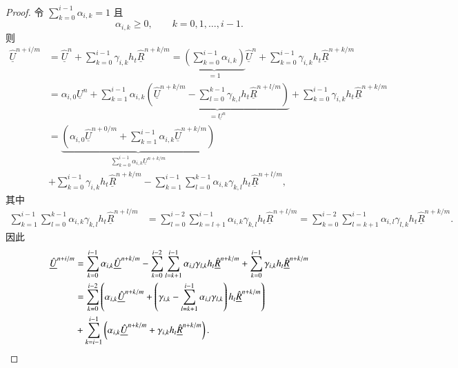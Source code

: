 \begin{proof}
令 $\sum_{k=0}^{i-1}\alpha_{i,k}=1$ 且
\begin{equation}
\alpha_{i,k}\ge0,\qquad k=0,1,\dots,i-1.
\end{equation}
则
\begin{equation}
\begin{aligned}\underline{\hat{U}}^{n+i/m} & =\underline{\hat{U}}^{n}+\sum_{k=0}^{i-1}\gamma_{i,k}h_{t}\underline{\hat{R}}^{n+k/m}=\underbrace{\left(\sum_{k=0}^{i-1}\alpha_{i,k}\right)}_{=1}\underline{\hat{U}}^{n}+\sum_{k=0}^{i-1}\gamma_{i,k}h_{t}\underline{\hat{R}}^{n+k/m}\\
 & =\alpha_{i,0}\underline{U}^{n}+\sum_{k=1}^{i-1}\alpha_{i,k}\underbrace{\left(\underline{\hat{U}}^{n+k/m}-\sum_{l=0}^{k-1}\gamma_{k,l}h_{t}\underline{\hat{R}}^{n+l/m}\right)}_{=\underline{U}^{n}}+\sum_{k=0}^{i-1}\gamma_{i,k}h_{t}\underline{\hat{R}}^{n+k/m}\\
 & =\underbrace{\left(\alpha_{i,0}\underline{\hat{U}}^{n+0/m}+\sum_{k=1}^{i-1}\alpha_{i,k}\underline{\hat{U}}^{n+k/m}\right)}_{\sum_{k=0}^{i-1}\alpha_{i,k}\underline{U}^{n+k/m}}\\
 & +\sum_{k=0}^{i-1}\gamma_{i,k}h_{t}\underline{\hat{R}}^{n+k/m}-\sum_{k=1}^{i-1}\sum_{l=0}^{k-1}\alpha_{i,k}\gamma_{k,l}h_{t}\underline{\hat{R}}^{n+l/m},
\end{aligned}
\end{equation}
其中
\begin{equation}
\begin{aligned}\sum_{k=1}^{i-1}\sum_{l=0}^{k-1}\alpha_{i,k}\gamma_{k,l}h_{t}\underline{\hat{R}}^{n+l/m} & =\sum_{l=0}^{i-2}\sum_{k=l+1}^{i-1}\alpha_{i,k}\gamma_{k,l}h_{t}\underline{\hat{R}}^{n+l/m}=\sum_{k=0}^{i-2}\sum_{l=k+1}^{i-1}\alpha_{i,l}\gamma_{l,k}h_{t}\underline{\hat{R}}^{n+k/m}.\end{aligned}
\end{equation}
因此
\begin{equation}
\begin{aligned}\underline{\hat{U}}^{n+i/m} & =\sum_{k=0}^{i-1}\alpha_{i,k}\underline{\hat{U}}^{n+k/m}-\sum_{k=0}^{i-2}\sum_{l=k+1}^{i-1}\alpha_{i,l}\gamma_{l,k}h_{t}\underline{\hat{R}}^{n+k/m}+\sum_{k=0}^{i-1}\gamma_{i,k}h_{t}\underline{\hat{R}}^{n+k/m}\\
 & =\sum_{k=0}^{i-2}\left(\alpha_{i,k}\underline{\hat{U}}^{n+k/m}+\left(\gamma_{i,k}-\sum_{l=k+1}^{i-1}\alpha_{i,l}\gamma_{l,k}\right)h_{t}\underline{\hat{R}}^{n+k/m}\right)\\
 & +\sum_{k=i-1}^{i-1}\left(\alpha_{i,k}\underline{\hat{U}}^{n+k/m}+\gamma_{i,k}h_{t}\underline{\hat{R}}^{n+k/m}\right).\qedhere
\end{aligned}
\end{equation}
\end{proof}


